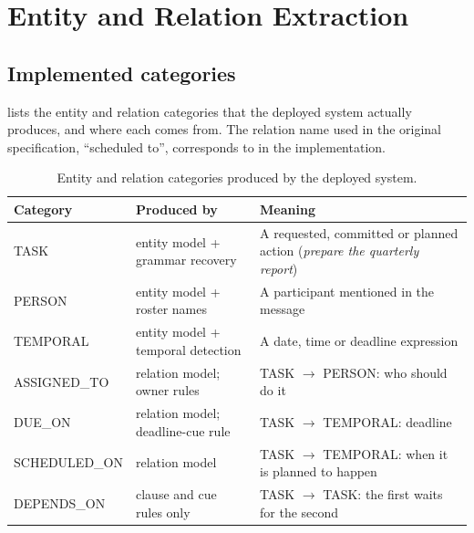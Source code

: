 \chapter{Entity and Relation Extraction}
\label{ch:extraction}

\section{Implemented categories}
 lists the entity and relation categories that the deployed system actually produces, and where each comes from. The relation name used in the original specification, ``scheduled to'', corresponds to  in the implementation.

\begin{table}[h]
\centering
\caption{Entity and relation categories produced by the deployed system.}
\label{tab:categories}
\footnotesize
\begin{tabularx}{\linewidth}{@{}p{28mm}p{26mm}L@{}}
\toprule
Category & Produced by & Meaning \\
\midrule
TASK & entity model + grammar recovery & A requested, committed or planned action (\emph{prepare the quarterly report}) \\
PERSON & entity model + roster names & A participant mentioned in the message \\
TEMPORAL & entity model + temporal detection & A date, time or deadline expression \\
ASSIGNED\_TO & relation model; owner rules & TASK $\to$ PERSON: who should do it \\
DUE\_ON & relation model; deadline-cue rule & TASK $\to$ TEMPORAL: deadline \\
SCHEDULED\_ON & relation model & TASK $\to$ TEMPORAL: when it is planned to happen \\
DEPENDS\_ON & clause and cue rules only & TASK $\to$ TASK: the first waits for the second \\
\bottomrule
\end{tabularx}
\end{table}

